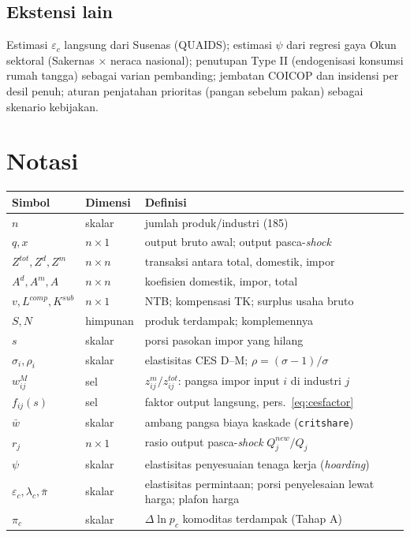 \documentclass[11pt,a4paper]{article}
\newcommand{\en}[1]{\textit{#1}}   %
\begin{document}
\subsection{Ekstensi lain}
Estimasi $\varepsilon_c$ langsung dari Susenas (QUAIDS); estimasi $\psi$
dari regresi gaya Okun sektoral (Sakernas $\times$ neraca nasional);
penutupan Type II (endogenisasi konsumsi rumah tangga) sebagai varian
pembanding; jembatan COICOP dan insidensi per desil penuh; aturan
penjatahan prioritas (pangan sebelum pakan) sebagai skenario kebijakan.

\appendix
\section{Notasi}

\begin{table}[ht]
\centering\small
\begin{tabular}{@{}llp{7.8cm}@{}}
\toprule
Simbol & Dimensi & Definisi \\
\midrule
$n$ & skalar & jumlah produk/industri (185) \\
$q, x$ & $n\times1$ & output bruto awal; output pasca-\en{shock} \\
$Z^{tot}, Z^{d}, Z^{m}$ & $n\times n$ & transaksi antara total, domestik, impor \\
$A^{d}, A^{m}, A$ & $n\times n$ & koefisien domestik, impor, total \\
$v, L^{comp}, K^{sub}$ & $n\times1$ & NTB; kompensasi TK; surplus usaha bruto \\
$S, N$ & himpunan & produk terdampak; komplemennya \\
$s$ & skalar & porsi pasokan impor yang hilang \\
$\sigma_i, \rho_i$ & skalar & elastisitas CES D--M; $\rho=(\sigma{-}1)/\sigma$ \\
$w^{M}_{ij}$ & sel & $z^m_{ij}/z^{tot}_{ij}$: pangsa impor input $i$ di industri $j$ \\
$f_{ij}(s)$ & sel & faktor output langsung, pers.~\eqref{eq:cesfactor} \\
$\bar w$ & skalar & ambang pangsa biaya kaskade (\texttt{critshare}) \\
$r_j$ & $n\times1$ & rasio output pasca-\en{shock} $Q^{new}_j/Q_j$ \\
$\psi$ & skalar & elastisitas penyesuaian tenaga kerja (\en{hoarding}) \\
$\varepsilon_c, \lambda_c, \bar\pi$ & skalar & elastisitas permintaan; porsi
penyelesaian lewat harga; plafon harga \\
$\pi_c$ & skalar & $\Delta\ln p_c$ komoditas terdampak (Tahap A) \\
\bottomrule
\end{tabular}
\end{table}
\end{document}
